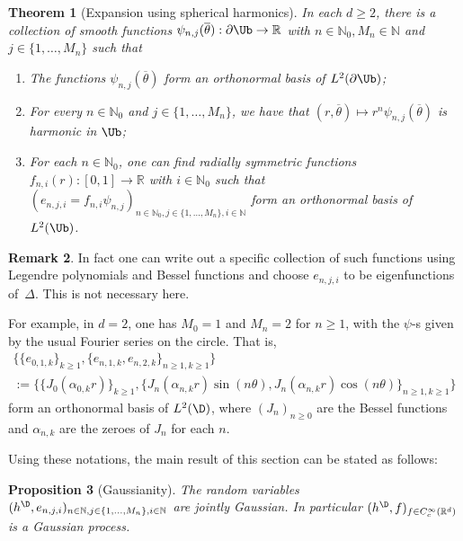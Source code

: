 \documentclass[10pt]{amsart}
\newtheorem{theorem}{Theorem}
\newtheorem{prop}[theorem]{Proposition}
\theoremstyle{definition}
\newtheorem{rmk}[theorem]{Remark}
\newcommand{\R}{\mathbb{R}}
\newcommand{\N}{\mathbb{N}}
\let\ol\overline
\begin{document}
\begin{theorem}[Expansion using spherical harmonics]\label{thm:sph}
In each $d \geq 2$, there is a collection of smooth functions $\psi_{n,j}(\ol{\theta}): \partial \Ub \to \R$ with $n \in \N_0, M_n \in \N$ and $j \in \{1, \dots, M_n\} $ such that
\begin{enumerate}
\item The functions $\psi_{n,j}(\ol{\theta})$ form an orthonormal basis of $L^2(\partial \Ub)$;
\item For every $n \in \N_0$ and $j \in \{1, \dots, M_n\} $, we have that $(r,\ol{\theta})\mapsto r^n\psi_{n,j}(\ol{\theta})$ is harmonic in $\Ub$;
\item For each $n \in \N_0$, one can find radially symmetric functions $f_{n,i}(r):[0,1] \to \R$ with $i \in \N_0$ such that $(e_{n,j,i} = f_{n,i}\psi_{n,j})_{n \in \N_0, j \in \{1, \dots, M_n\},i \in \N}$ form an orthonormal basis of $L^2(\Ub)$.
\end{enumerate}
\end{theorem}

\begin{rmk}
In fact one can write out a specific collection of such functions using Legendre polynomials and Bessel functions and choose $e_{n,j,i}$ to be eigenfunctions of~$\Delta$. This is not necessary here.

For example, in $d = 2$, one has $M_0=1$ and $M_n = 2$ for $n\ge 1$, with the $\psi$-s given by the usual Fourier series on the circle. That is,
\begin{multline*}
\bigl\{\{e_{0,1,k}\}_{k\ge 1},\{e_{n,1,k},e_{n,2,k}\}_{n\ge 1,k\ge 1} \bigr\}\\
:= \bigl\{\{J_0(\alpha_{0,k}r)\}_{k\ge 1}, \{J_n(\alpha_{n,k}r) \sin(n\theta), J_n(\alpha_{n,k}r) \cos(n\theta)\}_{n\ge 1, k\ge 1} \bigr\}
\end{multline*}
form an orthonormal basis of $L^2(\D)$, where $(J_n)_{n\ge 0}$ are the Bessel functions and $\alpha_{n,k}$ are the zeroes of $J_n$ for each $n$.
\end{rmk}
Using these notations, the main result of this section can be stated as follows:

\begin{prop}[Gaussianity]\label{prop:gauss}
The random variables $(h^\D,e_{n,j,i})_{n \in \N, j \in \{1, \dots, M_n\},i \in \N}$ are jointly Gaussian. In particular $(h^\D, f)_{f \in C_c^\infty(\R^d)}$ is a Gaussian process.
\end{prop}
\end{document}

